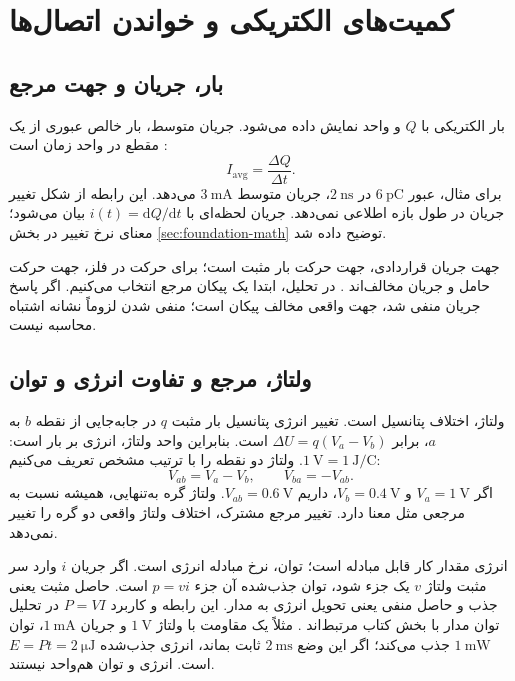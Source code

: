 \section{کمیت‌های الکتریکی و خواندن اتصال‌ها}
\label{sec:foundation-circuits}
\subsection{بار، جریان و جهت مرجع}
بار الکتریکی با \(Q\) و واحد  نمایش داده می‌شود.
جریان متوسط، بار خالص عبوری از یک مقطع در واحد زمان است \cite{current}:
\begin{equation}\label{eq:foundation-current}
I_{\mathrm{avg}}=\frac{\Delta Q}{\Delta t}.
\end{equation}
برای مثال، عبور \(\qty{6}{\pico\coulomb}\) در \(\qty{2}{\nano\second}\)،
جریان متوسط \(\qty{3}{\milli\ampere}\) می‌دهد.
این رابطه از شکل تغییر جریان در طول بازه اطلاعی نمی‌دهد.
جریان لحظه‌ای با \(i(t)=\mathrm{d}Q/\mathrm{d}t\) بیان می‌شود؛ معنای نرخ تغییر
در بخش \ref{sec:foundation-math} توضیح داده شد.

جهت جریان قراردادی، جهت حرکت بار مثبت است؛ برای حرکت  در فلز،
جهت حرکت حامل و جریان مخالف‌اند \cite{current}.
در تحلیل، ابتدا یک پیکان مرجع انتخاب می‌کنیم. اگر پاسخ جریان منفی شد،
جهت واقعی مخالف پیکان است؛ منفی شدن لزوماً نشانه اشتباه محاسبه نیست.

\subsection{ولتاژ، مرجع و تفاوت انرژی و توان}
ولتاژ، اختلاف پتانسیل است. تغییر انرژی پتانسیل بار مثبت \(q\) در جابه‌جایی
از نقطه \(b\) به \(a\)، برابر \(\Delta U=q(V_a-V_b)\) است.
بنابراین واحد ولتاژ، انرژی بر بار است:
\(\qty{1}{\volt}=\qty{1}{\joule\per\coulomb}\).
ولتاژ دو نقطه را با ترتیب مشخص تعریف می‌کنیم:
\begin{equation}\label{eq:foundation-voltage}
V_{ab}=V_a-V_b,\qquad V_{ba}=-V_{ab}.
\end{equation}
اگر \(V_a=\qty{1}{\volt}\) و \(V_b=\qty{0.4}{\volt}\)،
داریم \(V_{ab}=\qty{0.6}{\volt}\).
ولتاژ گره به‌تنهایی، همیشه نسبت به مرجعی مثل  معنا دارد.
تغییر مرجع مشترک، اختلاف ولتاژ واقعی دو گره را تغییر نمی‌دهد.

انرژی مقدار کار قابل مبادله است؛ توان، نرخ مبادله انرژی است.
اگر جریان \(i\) وارد سر مثبت ولتاژ \(v\) یک جزء شود، توان جذب‌شده آن جزء
\(p=vi\) است. حاصل مثبت یعنی جذب و حاصل منفی یعنی تحویل انرژی به مدار.
این رابطه و کاربرد \(P=VI\) در تحلیل توان مدار با بخش  کتاب مرتبط‌اند
\cite{weste}. مثلاً یک مقاومت با ولتاژ \(\qty{1}{\volt}\) و جریان
\(\qty{1}{\milli\ampere}\)، توان \(\qty{1}{\milli\watt}\) جذب می‌کند؛
اگر این وضع \(\qty{2}{\milli\second}\) ثابت بماند، انرژی جذب‌شده
\(E=Pt=\qty{2}{\micro\joule}\) است. انرژی و توان هم‌واحد نیستند.

